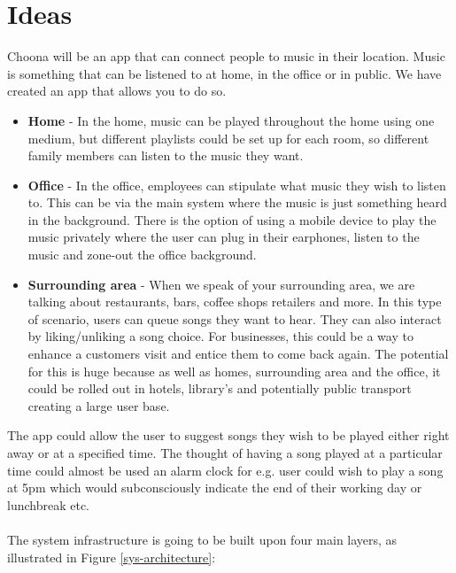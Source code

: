 \section{Ideas}

Choona will be an app that can connect people to music in their location.  Music is something that can be listened to at home, in the office or in public.  We have created an app that allows you to do so.  
\begin{itemize}
  \item \textbf{Home} - 
    In the home, music can be played throughout the home using one medium, but different playlists could be set up for each room, so different family members can listen to the music they want.
  \item \textbf{Office} - 
    In the office, employees can stipulate what music they wish to listen to.  This can be via the main system where the music is just something heard in the background.  There is the option of using a mobile device to play the music privately where the user can plug in their earphones, listen to the music and zone-out the office background.  
  \item \textbf{Surrounding area} - 
    When we speak of your surrounding area, we are talking about restaurants, bars, coffee shops retailers and more. In this type of scenario, users can queue songs they want to hear.  They can also interact by liking/unliking a song choice.  For businesses, this could be a way to enhance a customers visit and entice them to come back again. The potential for this is huge because as well as homes, surrounding area and the office, it could be rolled out in hotels, library's and potentially public transport creating a large user base.
\end{itemize}
The app could allow the user to suggest songs they wish to be played either right away or at a specified time.  The thought of having a song played at a particular time could almost be used an alarm clock for e.g. user could wish to play a song at 5pm which would subconsciously indicate the end of their working day or lunchbreak etc.\\\\
The system infrastructure is going to be built upon four main layers, as illustrated in Figure \ref{sys-architecture}:
